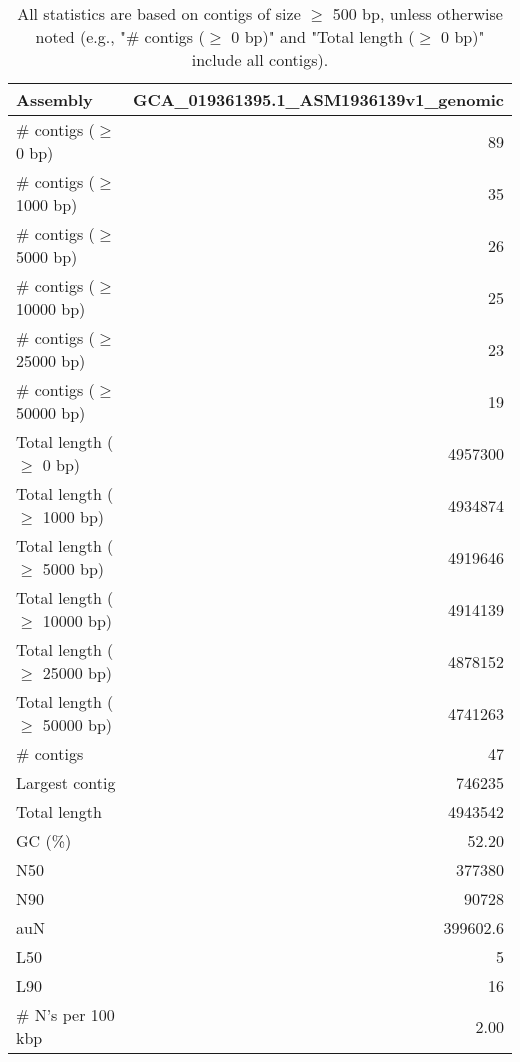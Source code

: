 \documentclass[12pt,a4paper]{article}
\begin{document}
\begin{table}[ht]
\begin{center}
\caption{All statistics are based on contigs of size $\geq$ 500 bp, unless otherwise noted (e.g., "\# contigs ($\geq$ 0 bp)" and "Total length ($\geq$ 0 bp)" include all contigs).}
\begin{tabular}{|l*{1}{|r}|}
\hline
Assembly & GCA\_019361395.1\_ASM1936139v1\_genomic \\ \hline
\# contigs ($\geq$ 0 bp) & 89 \\ \hline
\# contigs ($\geq$ 1000 bp) & 35 \\ \hline
\# contigs ($\geq$ 5000 bp) & 26 \\ \hline
\# contigs ($\geq$ 10000 bp) & 25 \\ \hline
\# contigs ($\geq$ 25000 bp) & 23 \\ \hline
\# contigs ($\geq$ 50000 bp) & 19 \\ \hline
Total length ($\geq$ 0 bp) & 4957300 \\ \hline
Total length ($\geq$ 1000 bp) & 4934874 \\ \hline
Total length ($\geq$ 5000 bp) & 4919646 \\ \hline
Total length ($\geq$ 10000 bp) & 4914139 \\ \hline
Total length ($\geq$ 25000 bp) & 4878152 \\ \hline
Total length ($\geq$ 50000 bp) & 4741263 \\ \hline
\# contigs & 47 \\ \hline
Largest contig & 746235 \\ \hline
Total length & 4943542 \\ \hline
GC (\%) & 52.20 \\ \hline
N50 & 377380 \\ \hline
N90 & 90728 \\ \hline
auN & 399602.6 \\ \hline
L50 & 5 \\ \hline
L90 & 16 \\ \hline
\# N's per 100 kbp & 2.00 \\ \hline
\end{tabular}
\end{center}
\end{table}
\end{document}
